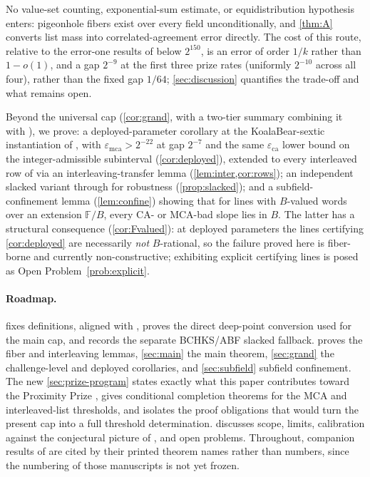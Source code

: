 \documentclass[11pt]{article}
\theoremstyle{definition}
\theoremstyle{remark}
\newcommand{\F}{\mathbb{F}}
\newcommand{\B}{B}
\newcommand{\eca}{\varepsilon_{\mathrm{ca}}}
\newcommand{\emca}{\varepsilon_{\mathrm{mca}}}
\begin{document}
No value-set counting, exponential-sum estimate, or equidistribution hypothesis enters: pigeonhole fibers exist over every field unconditionally, and \cref{thm:A} converts list mass into correlated-agreement error directly. The cost of this route, relative to the error-one results of \cite{Cho26a,Cho26b} below $2^{150}$, is an error of order $1/k$ rather than $1-o(1)$, and a gap $2^{-9}$ at the first three prize rates (uniformly $2^{-10}$ across all four), rather than the fixed gap $1/64$; \cref{sec:discussion} quantifies the trade-off and what remains open.

Beyond the universal cap (\cref{cor:grand}, with a two-tier summary combining it with \cite{Cho26b}), we prove: a deployed-parameter corollary at the KoalaBear-sextic instantiation of \cite[\S6.3]{ABF26}, with $\emca>2^{-22}$ at gap $2^{-7}$ and the same $\eca$ lower bound on the integer-admissible subinterval (\cref{cor:deployed}), extended to every interleaved row of \cite[Tables~2--3]{ABF26} via an interleaving-transfer lemma (\cref{lem:inter,cor:rows}); an independent slacked variant through \cite[Thm.~1.9]{BCHKS25} for robustness (\cref{prop:slacked}); and a subfield-confinement lemma (\cref{lem:confine}) showing that for lines with $\B$-valued words over an extension $\F/\B$, every CA- or MCA-bad slope lies in $\B$. The latter has a structural consequence (\cref{cor:Fvalued}): at deployed parameters the lines certifying \cref{cor:deployed} are necessarily \emph{not} $\B$-rational, so the failure proved here is fiber-borne and currently non-constructive; exhibiting explicit certifying lines is posed as Open Problem~\ref{prob:explicit}.

\paragraph{Roadmap.}  fixes definitions, aligned with \cite[Defs.~4.1, 4.3]{ABF26}, proves the direct deep-point conversion used for the main cap, and records the separate BCHKS/ABF slacked fallback.  proves the fiber and interleaving lemmas, \cref{sec:main} the main theorem, \cref{sec:grand} the challenge-level and deployed corollaries, and \cref{sec:subfield} subfield confinement. The new \cref{sec:prize-program} states exactly what this paper contributes toward the Proximity Prize \cite{ProximityPrize}, gives conditional completion theorems for the MCA and interleaved-list thresholds, and isolates the proof obligations that would turn the present cap into a full threshold determination.  discusses scope, limits, calibration against the conjectural picture of \cite{Cho26b}, and open problems. Throughout, companion results of \cite{Cho26a,Cho26b} are cited by their printed theorem names rather than numbers, since the numbering of those manuscripts is not yet frozen.
\end{document}
